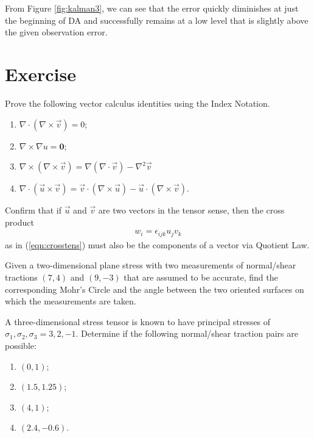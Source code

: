 From Figure \ref{fig:kalman3}, we can see that the error quickly diminishes at just the beginning of DA and successfully remains at a low level that is slightly above the given observation error.

\section{Exercise}

\begin{Exercise}
Prove the following vector calculus identities using the Index Notation.
\begin{enumerate}[label=(\alph*)]
    \item $\nabla \cdot (\nabla \times \vec{v}) = 0$;
    \item $\nabla \times \nabla u = \textbf{0}$;
    \item $\nabla \times (\nabla \times \vec{v}) = \nabla (\nabla \cdot \vec{v}) - \nabla^2 \vec{v}$
    \item $\nabla \cdot (\vec{u} \times \vec{v}) = \vec{v} \cdot (\nabla \times \vec{u}) - \vec{u} \cdot (\nabla \times \vec{v})$.
\end{enumerate}
\end{Exercise}

\begin{Exercise}
Confirm that if $\vec{u}$ and $\vec{v}$ are two vectors in the tensor sense, then the cross product
\begin{align*}
w_i = \epsilon_{ijk}u_jv_k
\end{align*}
as in (\ref{eqn:crosstens}) must also be the components of a vector via Quotient Law.
\end{Exercise}

\begin{Exercise}
Given a two-dimensional plane stress with two measurements of normal/shear tractions $(7,4)$ and $(9,-3)$ that are assumed to be accurate, find the corresponding Mohr's Circle and the angle between the two oriented surfaces on which the measurements are taken.
\end{Exercise}

\begin{Exercise}
A three-dimensional stress tensor is known to have principal stresses of $\sigma_1, \sigma_2, \sigma_3 = 3,2,-1$. Determine if the following normal/shear traction pairs are possible:
\begin{enumerate}[label=(\alph*)]
    \item $(0,1)$;
    \item $(1.5,1.25)$;
    \item $(4,1)$;
    \item $(2.4,-0.6)$.
\end{enumerate}
\end{Exercise}

